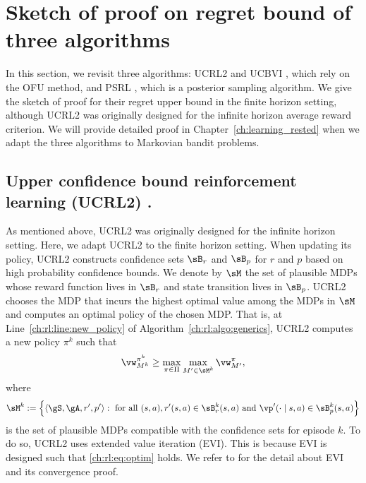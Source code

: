 \section{Sketch of proof on regret bound of three algorithms}

In this section, we revisit three algorithms: UCRL2 \cite{jaksch2010near} and UCBVI \cite{azar2017minimax}, which rely on the OFU method, and PSRL \cite{osband2013more}, which is a posterior sampling algorithm.
We give the sketch of proof for their regret upper bound in the finite horizon setting, although UCRL2 was originally designed for the infinite horizon average reward criterion.
We will provide detailed proof in Chapter~\ref{ch:learning_rested} when we adapt the three algorithms to Markovian bandit problems.

\subsection{Upper confidence bound reinforcement learning (UCRL2) \texorpdfstring{\cite{jaksch2010near}}{[JOA10]}.}
As mentioned above, UCRL2 was originally designed for the infinite horizon setting.
Here, we adapt UCRL2 to the finite horizon setting.
When updating its policy, UCRL2 constructs confidence sets $\sB_r$ and $\sB_p$ for $r$ and $p$ based on high probability confidence bounds.
We denote by $\sM$ the set of plausible MDPs whose reward function lives in $\sB_r$ and state transition lives in $\sB_p$.
UCRL2 chooses the MDP that incurs the highest optimal value among the MDPs in $\sM$ and computes an optimal policy of the chosen MDP.
That is, at Line~\ref{ch:rl:line:new_policy} of Algorithm~\ref{ch:rl:algo:generics}, UCRL2 computes a new policy $\pi^k$ such that
\begin{equation}
    \label{ch:rl:eq:optim}
    \vw_{M^k}^{\pi^k} \ge \max_{\pi\in\Pi}\max_{M'\in\sM^k} \vw_{M'}^\pi,
\end{equation}
where
\begin{align*}
    \sM^k:=\Big\{\langle\gS,\gA,r',p'\rangle :
    \text{ for all }(s,a), r'(s,a)\in\sB_r^k(s,a) \text{ and } \vp'(\cdot\mid s,a)\in\sB_p^k(s,a)\Big\}
\end{align*}
is the set of plausible MDPs compatible with the confidence sets for episode $k$.
To do so, UCRL2 uses extended value iteration (EVI).
This is because EVI is designed such that \eqref{ch:rl:eq:optim} holds.
We refer to \cite{jaksch2010near} for the detail about EVI and its convergence proof.

